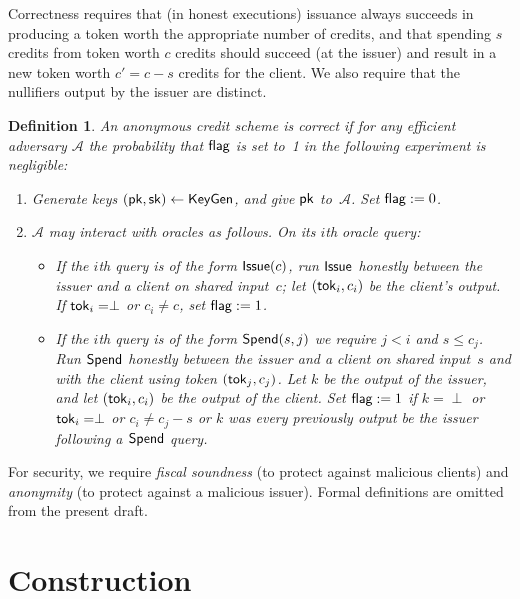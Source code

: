 \documentclass[11pt]{article}
\newtheorem{definition}{Definition}
\def\A{{\mathcal A}}
\def\issue{{\sf Issue}}
\def\keygen{{\sf KeyGen}}
\def\pk{{\sf pk}}
\def\sk{{\sf sk}}
\def\tok{{\sf tok}}
\def\spend{{\sf Spend}}
\def\flag{{\sf flag}}
\begin{document}
Correctness requires that (in honest executions) issuance always succeeds in producing a token worth the appropriate number of credits, and that spending $s$ credits from token worth $c$ credits should succeed (at the issuer) and result in a new token worth $c'=c-s$ credits for the client. 
We also require that the nullifiers output by the issuer are distinct.

\begin{definition}
An anonymous credit scheme is {\sf correct} if for any efficient adversary $\A$ the probability that $\flag$ is set to~1 in the following experiment is negligible:
\begin{enumerate}
    \item Generate  keys $(\pk, \sk) \leftarrow \keygen$, and give $\pk$ to~$\A$. Set $\flag:=0$.
    \item $\A$ may interact with oracles as follows. On its $i$th oracle query:
    \begin{itemize}
        \item If the $i$th query is of the form $\issue(c)$, run $\issue$ honestly between the issuer and a client on shared input~$c$; let $(\tok_i, c_i)$ be the client's output.
        If $\tok_i=\perp$ or $c_i\neq c$, set $\flag:=1$.
        
        \item If the $i$th query is of the form $\spend(s, j)$ we require $j < i$ and $s \leq c_j$. 
        Run $\spend$ honestly between the issuer and a client on shared input~$s$ and with the client using token $(\tok_j, c_j)$. Let $k$ be the output of the issuer, and let $(\tok_i, c_i)$ be the output of the client. Set $\flag:=1$ if $k=\perp$ or $\tok_i=\perp$ or $c_i \neq c_j-s$ or $k$ was every previously output be the issuer following a $\spend$ query.
    \end{itemize}
\end{enumerate}
\end{definition}

For security, we require \emph{fiscal soundness} (to protect against malicious clients) and \emph{anonymity} (to protect against a malicious issuer). 
Formal definitions are omitted from the present draft.

\section{Construction}
\end{document}
